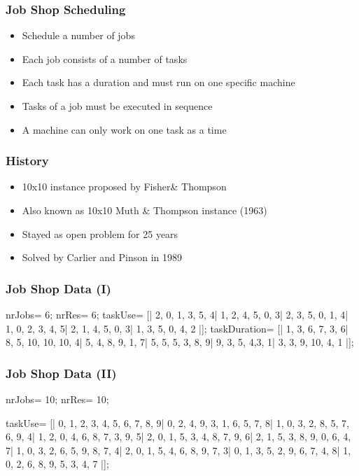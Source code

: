 \begin{frame}
  \frametitle{Job Shop Scheduling}
  \begin{itemize}
  \item Schedule a number of jobs
  \item Each job consists of a number of tasks
  \item Each task has a duration and must run on one specific machine
  \item Tasks of a job must be executed in sequence
    \item A machine can only work on one task as a time
  \end{itemize}
\end{frame}

\begin{frame}
  \frametitle{History}
  \begin{itemize}
  \item 10x10 instance proposed by Fisher\& Thompson
  \item Also known as 10x10 Muth \& Thompson instance (1963)
    \item Stayed as open problem for 25 years
  \item Solved by Carlier and Pinson in 1989   
  \end{itemize}
\end{frame}


\begin{frame}[fragile]
  \frametitle{Job Shop Data (I)}
  \begin{semiverbatim}
nrJobs= 6;
nrRes= 6;
taskUse= [|
   2, 0, 1, 3, 5, 4|
   1, 2, 4, 5, 0, 3|
   2, 3, 5, 0, 1, 4|
   1, 0, 2, 3, 4, 5|
   2, 1, 4, 5, 0, 3|
   1, 3, 5, 0, 4, 2 |];
taskDuration= [|
   1, 3, 6, 7, 3, 6|
   8, 5, 10, 10, 10, 4|
   5, 4, 8, 9, 1, 7|
   5, 5, 5, 3, 8, 9|
   9, 3, 5, 4,3, 1|
   3, 3, 9, 10, 4, 1 |];
  \end{semiverbatim}
\end{frame}

\begin{frame}[fragile]
  \frametitle{Job Shop Data (II)}
    \begin{semiverbatim}
nrJobs= 10;
nrRes= 10;

taskUse= [|
	0, 1, 2, 3, 4, 5, 6, 7, 8, 9|
	0, 2, 4, 9, 3, 1, 6, 5, 7, 8|
	1, 0, 3, 2, 8, 5, 7, 6, 9, 4|
	1, 2, 0, 4, 6, 8, 7, 3, 9, 5|
	2, 0, 1, 5, 3, 4, 8, 7, 9, 6|
	2, 1, 5, 3, 8, 9, 0, 6, 4, 7|
	1, 0, 3, 2, 6, 5, 9, 8, 7, 4|
	2, 0, 1, 5, 4, 6, 8, 9, 7, 3|
	0, 1, 3, 5, 2, 9, 6, 7, 4, 8|
	1, 0, 2, 6, 8, 9, 5, 3, 4, 7 |];
    \end{semiverbatim}
\end{frame}

